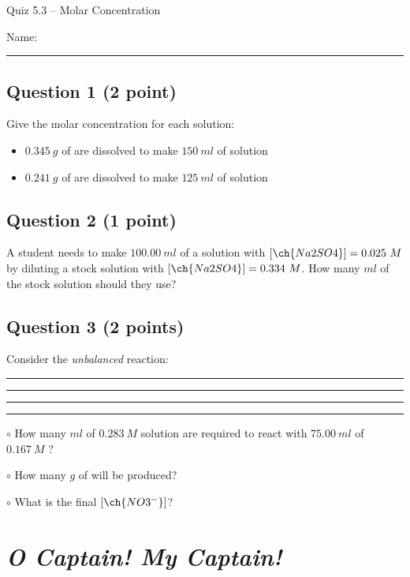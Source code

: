 \documentclass[11pt, letterpaper]{memoir}
\begin{document}
	\begin{center}
		{\large	Quiz 5.3 -- Molar Concentration}
	\end{center}
{\large Name: \rule[-1mm]{4in}{.1pt}
	
	\subsection*{Question 1 (2 point)}
	Give the molar concentration for each solution:	
	\begin{itemize}
		\item $0.345~g$ of  are dissolved to make $150~ml$ of solution
		\item \vspace{2em} $0.241~g$ of  are dissolved to make $125~ml$ of solution
	\end{itemize}
	
	\vspace{1em}
	\subsection*{Question 2 (1 point)}
	A student needs to make $100.00~ml$ of a solution with $\left[\ch{Na2SO4}\right] = 0.025~M$ by diluting a stock solution with $\left[\ch{Na2SO4}\right] = 0.334~M$. How many $ml$ of the stock solution should they use?
	
	\vspace{6em}
	\subsection*{Question 3 (2 points)} 
	Consider the \emph{unbalanced} reaction: \rule[-1mm]{0.25in}{.1pt}\rule[-1mm]{0.25in}{.1pt}\rule[-1mm]{0.25in}{.1pt}\rule[-1mm]{0.25in}{.1pt}
	
	\noindent$\circ$ How many $ml$ of $0.283~M$  solution are required to react with $75.00~ml$ of $0.167~M$ ?
	
	\vspace{5.5em}
	\noindent$\circ$ How many $g$ of  will be produced?
	
	\vspace{5.5em}
	\noindent$\circ$ What is the final $\left[\ch{NO3^-}\right]$?
\newpage
\pagestyle{empty}
\addtocounter{page}{-1}
\section*{\emph{O Captain! My Captain!}}
}
\end{document}
